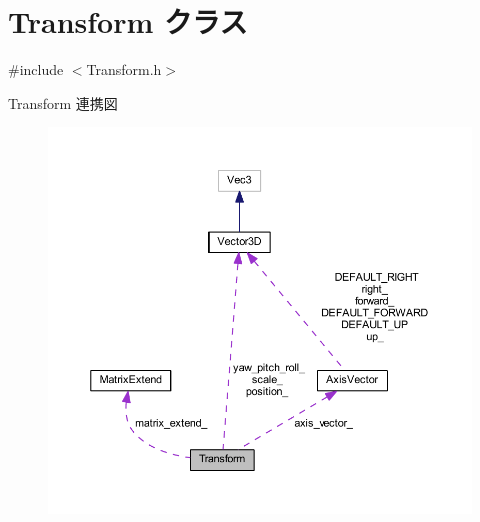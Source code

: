 \hypertarget{class_transform}{}\section{Transform クラス}
\label{class_transform}


{\ttfamily \#include $<$Transform.\+h$>$}



Transform 連携図\nopagebreak
\begin{figure}[H]
\begin{center}
\leavevmode
\includegraphics[width=350pt]{class_transform__coll__graph}
\end{center}
\end{figure}
